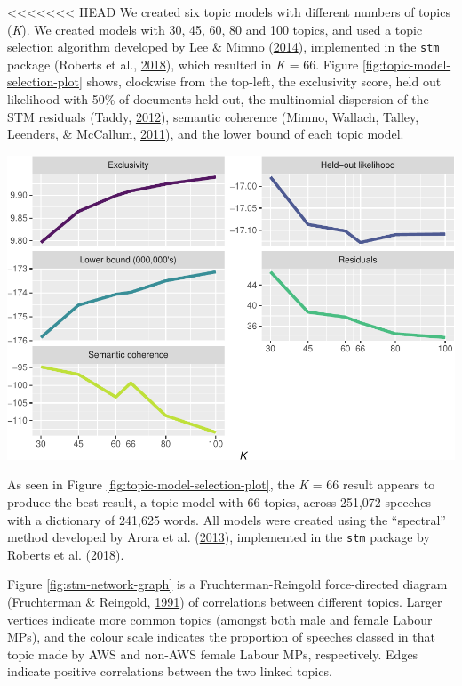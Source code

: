 \documentclass[]{article}
\let\origfigure\figure
\let\endorigfigure\endfigure
\renewenvironment{figure}[1][2] {
    \expandafter\origfigure\expandafter[H]
} {
    \endorigfigure
}
\theoremstyle{definition}
\theoremstyle{definition}
\theoremstyle{definition}
\theoremstyle{remark}
\begin{document}
\begin{table}[H]
\begin{table}[H]
\begin{table}[H]
\begin{table}[H]
\begin{table}[H]
\begin{table}[H]
\begin{table}[H]
\begin{table}[H]
\begin{figure}
<<<<<<< HEAD
We created six topic models with different numbers of topics (\emph{K}).
We created models with 30, 45, 60, 80 and 100 topics, and used a topic
selection algorithm developed by Lee \& Mimno
(\protect\hyperlink{ref-lee2014c}{2014}), implemented in the
\texttt{stm} package (Roberts et al.,
\protect\hyperlink{ref-roberts2018}{2018}), which resulted in \emph{K} =
66. Figure \ref{fig:topic-model-selection-plot} shows, clockwise from
the top-left, the exclusivity score, held out likelihood with 50\% of
documents held out, the multinomial dispersion of the STM residuals
(Taddy, \protect\hyperlink{ref-taddy2012}{2012}), semantic coherence
(Mimno, Wallach, Talley, Leenders, \& McCallum,
\protect\hyperlink{ref-mimno2011}{2011}), and the lower bound of each
topic model.

\begin{figure}
\centering
\includegraphics{methodology_files/figure-latex/topic-model-selection-plot-1.pdf}
\caption{\label{fig:topic-model-selection-plot}Topic Model Selection}
\end{figure}

As seen in Figure \ref{fig:topic-model-selection-plot}, the \emph{K} =
66 result appears to produce the best result, a topic model with 66
topics, across 251,072 speeches with a dictionary of 241,625 words. All
models were created using the ``spectral'' method developed by Arora et
al. (\protect\hyperlink{ref-arora2013}{2013}), implemented in the
\texttt{stm} package by Roberts et al.
(\protect\hyperlink{ref-roberts2018}{2018}).

Figure \ref{fig:stm-network-graph} is a Fruchterman-Reingold
force-directed diagram (Fruchterman \& Reingold,
\protect\hyperlink{ref-fruchterman1991}{1991}) of correlations between
different topics. Larger vertices indicate more common topics (amongst
both male and female Labour MPs), and the colour scale indicates the
proportion of speeches classed in that topic made by AWS and non-AWS
female Labour MPs, respectively. Edges indicate positive correlations
between the two linked topics.


\end{figure}
\end{table}
\end{table}
\end{table}
\end{table}
\end{table}
\end{table}
\end{table}
\end{table}
\end{document}
